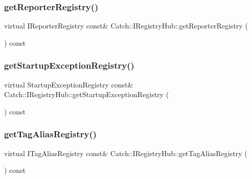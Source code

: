 \subsubsection{\texorpdfstring{get\+Reporter\+Registry()}{getReporterRegistry()}}
{\footnotesize\ttfamily virtual I\+Reporter\+Registry const\& Catch\+::\+I\+Registry\+Hub\+::get\+Reporter\+Registry (\begin{DoxyParamCaption}{ }\end{DoxyParamCaption}) const\hspace{0.3cm}{\ttfamily [pure virtual]}}

\mbox{\label{struct_catch_1_1_i_registry_hub_a00281210628e6c616aca1d3e0d84db04}} 
\subsubsection{\texorpdfstring{get\+Startup\+Exception\+Registry()}{getStartupExceptionRegistry()}}
{\footnotesize\ttfamily virtual Startup\+Exception\+Registry const\& Catch\+::\+I\+Registry\+Hub\+::get\+Startup\+Exception\+Registry (\begin{DoxyParamCaption}{ }\end{DoxyParamCaption}) const\hspace{0.3cm}{\ttfamily [pure virtual]}}

\mbox{\label{struct_catch_1_1_i_registry_hub_a3c511b1d33e5a6d95c333a0ff387df1a}} 
\subsubsection{\texorpdfstring{get\+Tag\+Alias\+Registry()}{getTagAliasRegistry()}}
{\footnotesize\ttfamily virtual I\+Tag\+Alias\+Registry const\& Catch\+::\+I\+Registry\+Hub\+::get\+Tag\+Alias\+Registry (\begin{DoxyParamCaption}{ }\end{DoxyParamCaption}) const\hspace{0.3cm}{\ttfamily [pure virtual]}}

